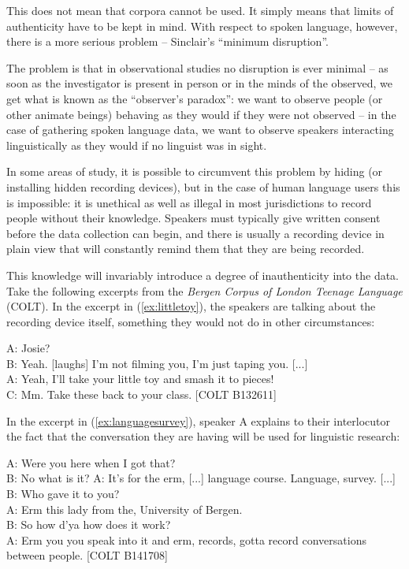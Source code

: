 This does not mean that corpora cannot be used. It simply means that limits of authenticity  have to be kept in mind. With respect to spoken  language, however, there is a more serious problem -- Sinclair's ``minimum disruption''.

The problem is that in observational  studies no disruption is ever minimal -- as soon as the investigator is present in person or in the minds of the observed, we get what is known as the ``observer's paradox'': we want to observe people (or other animate beings) behaving as they would if they were not observed -- in the case of gathering spoken  language data, we want to observe speakers interacting linguistically as they would if no linguist was in sight.

In some areas of study, it is possible to circumvent this problem by hiding (or installing hidden recording devices), but in the case of human language users this is impossible: it is unethical as well as illegal in most jurisdictions to record people without their knowledge. Speakers must typically give written consent before the data collection can begin, and there is usually a recording device in plain view that will constantly remind them that they are being recorded.

This knowledge will invariably introduce a degree of inauthenticity into the data. Take the following excerpts from the \emph{Bergen Corpus of London Teenage Language} (COLT). In the excerpt in (\ref{ex:littletoy}), the speakers are talking about the recording device itself, something they would not do in other circumstances:

\begin{exe}
\ex
\label{ex:littletoy}
A: Josie? \\
B: Yeah. [laughs] I'm not filming you, I'm just taping you. [...] \\
A: Yeah, I'll take your little toy and smash it to pieces! \\
C: Mm. Take these back to your class. [COLT B132611]
\end{exe}

In the excerpt in (\ref{ex:languagesurvey}), speaker A explains to their interlocutor the fact that the conversation  they are having will be used for linguistic research:

\begin{exe}
\ex
\label{ex:languagesurvey}
A: Were you here when I got that? \\
B: No what is it? A: It's for the erm, [...] language course. Language, survey. [...] \\
B: Who gave it to you? \\
A: Erm this lady from the, University of Bergen. \\
B: So how d'ya how does it work? \\
A: Erm you you speak into it and erm, records, gotta record conversations between people. [COLT B141708]
\end{exe}

